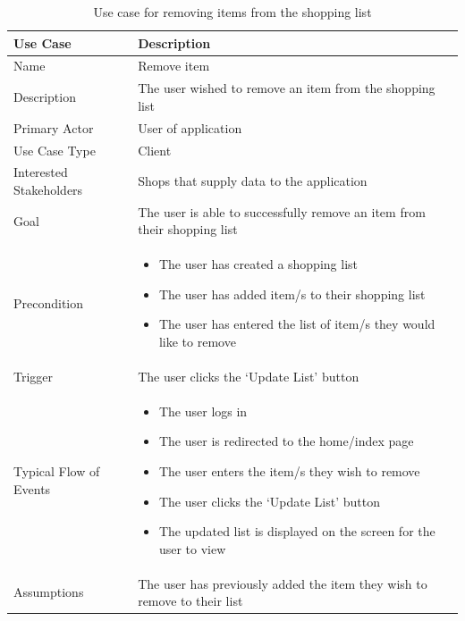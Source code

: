 \documentclass[10pt,twocolumn]{witseiepaper}
\begin{document}
		\begin{table}[htbp]
			\centering
			\caption{Use case for removing items from the shopping list}
			\label{uc:remove_item}
			\begin{tabular}{|p{}|p{}|}
				\hline
				\textbf{Use Case} & \textbf{Description} \\ \hline
				Name & Remove item \\ \hline
				Description & The user wished to remove an item from the shopping list \\ \hline
				Primary Actor & User of application \\ \hline
				Use Case Type & Client \\ \hline
				Interested Stakeholders & Shops that supply data to the application \\ \hline
				Goal & The user is able to successfully remove an item from their shopping list \\ \hline
				Precondition &
				\begin{itemize}
					\item The user has created a shopping list
					\item The user has added item/s to their shopping list
					\item The user has entered the list of item/s they would like to remove
				\end{itemize}
				\\ \hline
				Trigger & The user clicks the `Update List' button \\ \hline
				Typical Flow of Events & 
				\begin{itemize}
					\item The user logs in
					\item The user is redirected to the home/index page
					\item The user enters the item/s they wish to remove
					\item The user clicks the `Update List' button
					\item The updated list is displayed on the screen for the user to view
				\end{itemize}
				\\ \hline
				Assumptions & The user has previously added the item they wish to remove to their list \\
				\hline
			\end{tabular}
		\end{table}
		
\end{document}
